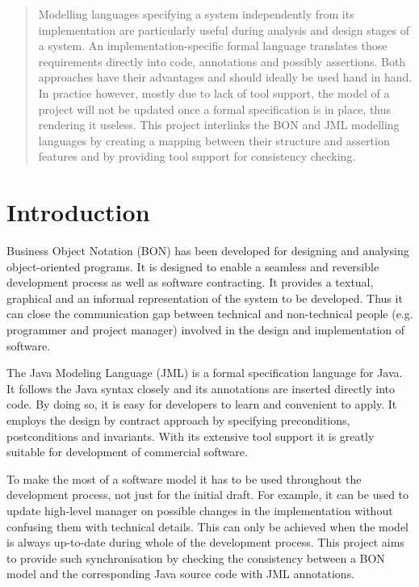 \documentclass[]{mngt_deliverable}
\begin{document}
\maketitle


\begin{abstract}
Modelling languages specifying a system independently from its 
implementation are particularly useful during analysis and design stages
of a system. An implementation-specific formal language translates those 
requirements directly into code, annotations and possibly assertions. 
Both approaches have their advantages and should ideally be used hand 
in hand. In practice however, mostly due to lack of tool support, the 
model of a project will not be updated once a formal specification is 
in place, thus rendering it useless. This project interlinks the BON and
JML modelling languages by creating a mapping between their structure 
and assertion features and by providing tool support for consistency 
checking. 
\end{abstract}
\newpage
\chapter{Introduction}
Business Object Notation (BON) has been developed for designing and analysing object-oriented programs. It is designed to enable a seamless and reversible development process as well as software contracting. It provides a textual, graphical and an informal representation of the system to be developed. Thus it can close the communication gap between technical and non-technical people (e.g. programmer and project manager) involved in the design and implementation of software.

The Java Modeling Language (JML) is a formal specification language for Java. It follows the Java syntax closely and its annotations are inserted directly into code. By doing so, it is easy for developers to learn and convenient to apply. It employs the design by contract approach by specifying preconditions, postconditions and invariants. With its extensive tool support it is greatly suitable for development of commercial software.

To make the most of a software model it has to be used throughout the development process, not just for the initial draft. For example, it can be used to update high-level manager on possible changes in the implementation without confusing them with technical details. This can only be achieved when the model is always up-to-date during whole of the development process. This project aims to provide such synchronisation by checking the consistency between a BON model and the corresponding Java source code with JML annotations.
\end{document}

